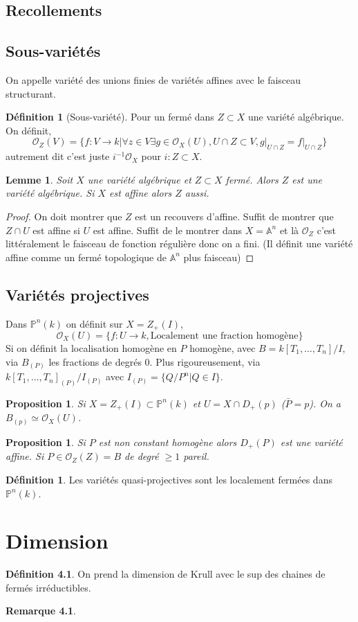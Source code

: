 \documentclass[a4paper,12pt]{book}
\newcommand{\A}{\mathbb{A}}
\newcommand{\Or}{\mathcal{O}}
\renewcommand{\P}{\mathbb{P}}
\theoremstyle{plain}
\newtheorem{lem}[subsection]{Lemme}
\newtheorem{prop}[subsection]{Proposition}
\newtheorem{rem}{Remarque}
\theoremstyle{definition}
\newtheorem{defn}[subsection]{Définition}
\theoremstyle{remark}
\begin{document}
\section{Recollements}
\section{Sous-variétés}
On appelle variété des unions finies de variétés affines avec le 
faisceau structurant.

\begin{defn}[Sous-variété]
    Pour un fermé dans $Z\subset X$ une variété algébrique. On définit,
    \[\Or_Z(V)=\{f\colon V\to k|\forall z\in V \exists g\in \Or_X(U),
    U\cap Z\subset V,g|_{U\cap Z}=f|_{U\cap Z}\}\]
    autrement dit c'est juste $i^{-1}\Or_X$ pour $i\colon Z\subset X$.
\end{defn}

\begin{lem}
    Soit $X$ une variété algébrique et $Z\subset X$ fermé. Alors
    $Z$ est une variété algébrique. Si $X$ est affine alors $Z$ aussi.
\end{lem}
\begin{proof}
    On doit montrer que $Z$ est un recouvers d'affine. Suffit de 
    montrer que $Z\cap U$ est affine si $U$ est affine. Suffit de
    le montrer dans $X=\A^n$ et là $\Or_Z$ c'est littéralement
    le faisceau de fonction régulière donc on a fini. (Il définit une
    variété affine comme un fermé topologique de $\A^n$ plus faisceau)
\end{proof}


\section{Variétés projectives}
Dans $\P^n(k)$ on définit sur $X=Z_+(I)$, \[\Or_X(U)=\{f\colon U\to k,
\textrm{Localement une fraction homogène}\}\]
Si on définit la localisation homogène en $P$ homogène, avec $B=k[T_1,
\ldots,T_n]/I$, via $B_{(P)}$ les fractions de degrés $0$. Plus
rigoureusement, via $k[T_1,\ldots, T_n]_{(P)}/I_{(P)}$ avec $I_{(P)}=
\{Q/P^n|Q\in I\}$.
\begin{prop}
    Si $X=Z_+(I)\subset \P^n(k)$ et $U=X\cap D_+(p)$ ($\bar P=p$). On a
    $B_{(p)}\simeq \Or_X(U)$.
\end{prop}

\begin{prop}
    Si $P$ est non constant homogène alors $D_+(P)$ est une variété 
    affine. Si $P\in \Or_Z(Z)=B$ de degré $\geq 1$ pareil.
\end{prop}

\begin{defn}
    Les variétés quasi-projectives sont les localement fermées dans
    $\P^n(k)$.
\end{defn}
\chapter{Dimension}
\begin{defn}
    On prend la dimension de Krull avec le sup des chaines de fermés
    irréductibles.
\end{defn}

\begin{rem}

\end{rem}
\printbibliography
\end{document}
